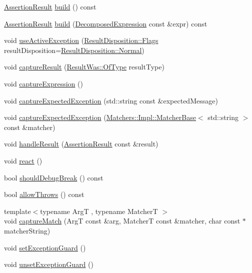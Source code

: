 \begin{DoxyCompactItemize}
\item 
\hyperlink{classCatch_1_1AssertionResult}{Assertion\-Result} \hyperlink{classCatch_1_1ResultBuilder_a31eba48feb02817d2151e31bd8331eeb}{build} () const 
\item 
\hyperlink{classCatch_1_1AssertionResult}{Assertion\-Result} \hyperlink{classCatch_1_1ResultBuilder_a606377d75e78899c90f94816ae8aff61}{build} (\hyperlink{structCatch_1_1DecomposedExpression}{Decomposed\-Expression} const \&expr) const 
\item 
void \hyperlink{classCatch_1_1ResultBuilder_a5bbd2f14a678f3e8d0f791ac6d233d65}{use\-Active\-Exception} (\hyperlink{structCatch_1_1ResultDisposition_a3396cad6e2259af326b3aae93e23e9d8}{Result\-Disposition\-::\-Flags} result\-Disposition=\hyperlink{structCatch_1_1ResultDisposition_a3396cad6e2259af326b3aae93e23e9d8af3bd52347ed6f8796e8ce2f77bb39ea5}{Result\-Disposition\-::\-Normal})
\item 
void \hyperlink{classCatch_1_1ResultBuilder_a10e467f7b7a4976e5d148b4d5066e8fd}{capture\-Result} (\hyperlink{structCatch_1_1ResultWas_a624e1ee3661fcf6094ceef1f654601ef}{Result\-Was\-::\-Of\-Type} result\-Type)
\item 
void \hyperlink{classCatch_1_1ResultBuilder_af2ae2343965802eeeb0abbd4ea9d2d36}{capture\-Expression} ()
\item 
void \hyperlink{classCatch_1_1ResultBuilder_a9ac96f6220c8dd8e4feee725c6228d77}{capture\-Expected\-Exception} (std\-::string const \&expected\-Message)
\item 
void \hyperlink{classCatch_1_1ResultBuilder_a2d6a194258f07f212fef098c0201038a}{capture\-Expected\-Exception} (\hyperlink{structCatch_1_1Matchers_1_1Impl_1_1MatcherBase}{Matchers\-::\-Impl\-::\-Matcher\-Base}$<$ std\-::string $>$ const \&matcher)
\item 
void \hyperlink{classCatch_1_1ResultBuilder_ad8bb17e4ac590b75bf8630d8f3502f4e}{handle\-Result} (\hyperlink{classCatch_1_1AssertionResult}{Assertion\-Result} const \&result)
\item 
void \hyperlink{classCatch_1_1ResultBuilder_a3085cdc46533d45bed6f652a2ac295c0}{react} ()
\item 
bool \hyperlink{classCatch_1_1ResultBuilder_a34cdbf7ad1e5b3cb4a94047f2d14bcb2}{should\-Debug\-Break} () const 
\item 
bool \hyperlink{classCatch_1_1ResultBuilder_a3dbf18a3a4b00173dab052a8864e435e}{allow\-Throws} () const 
\item 
{\footnotesize template$<$typename Arg\-T , typename Matcher\-T $>$ }\\void \hyperlink{classCatch_1_1ResultBuilder_a27425538bec8fee7ac69403c5df6078c}{capture\-Match} (Arg\-T const \&arg, Matcher\-T const \&matcher, char const $\ast$matcher\-String)
\item 
void \hyperlink{classCatch_1_1ResultBuilder_a87929808b4ec9b6cb5838edc1f27df17}{set\-Exception\-Guard} ()
\item 
void \hyperlink{classCatch_1_1ResultBuilder_a0990e93c1e13f96ffe02fa0f45e8f155}{unset\-Exception\-Guard} ()
\end{DoxyCompactItemize}


